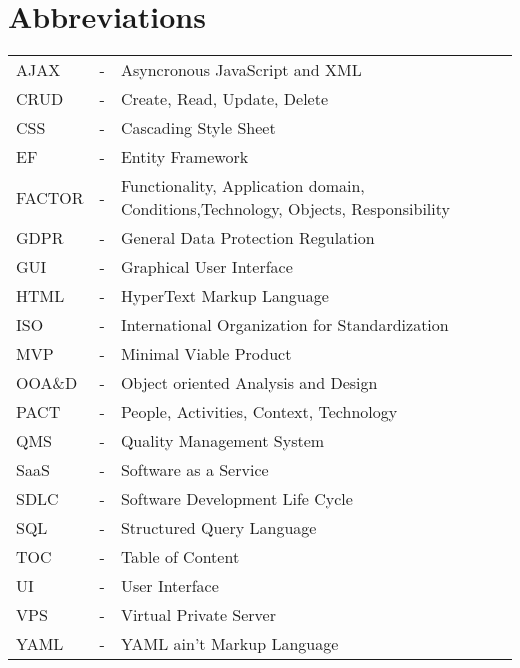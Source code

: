 \chapter{Abbreviations}\label{sec:abbrivitation}
\begin{tabular}{ll p{10cm}}
	AJAX & - & Asyncronous JavaScript and XML \\
	CRUD & - & Create, Read, Update, Delete \\
	CSS & - & Cascading Style Sheet\\
	EF & - & Entity Framework \\
	FACTOR & - & Functionality, Application domain, Conditions,\newline Technology, Objects, Responsibility\\
	GDPR & - & General Data Protection Regulation \\
	GUI & - & Graphical User Interface \\
	HTML & - & HyperText Markup Language \\
	ISO & - & International Organization for Standardization\\
	MVP & - & Minimal Viable Product \\
	OOA\&D & - & Object oriented Analysis and Design\\
	PACT & - & People, Activities, Context, Technology \\
	QMS & - & Quality Management System \\
	SaaS & - & Software as a Service \\
	SDLC & - & Software Development Life Cycle \\
	SQL & - & Structured Query Language \\
	TOC & - & Table of Content\\
	UI & - & User Interface\\
	VPS & - & Virtual Private Server\\
	YAML & - & YAML ain't Markup Language\\
	
\end{tabular}
